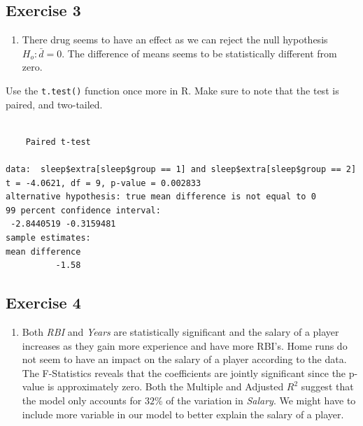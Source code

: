 \documentclass[
  letterpaper,
  DIV=11,
  numbers=noendperiod]{scrreprt}
\newenvironment{Shaded}{\begin{snugshade}}{\end{snugshade}}
\newcommand{\AttributeTok}[1]{\textcolor[rgb]{0.40,0.45,0.13}{#1}}
\newcommand{\DecValTok}[1]{\textcolor[rgb]{0.68,0.00,0.00}{#1}}
\newcommand{\FloatTok}[1]{\textcolor[rgb]{0.68,0.00,0.00}{#1}}
\newcommand{\FunctionTok}[1]{\textcolor[rgb]{0.28,0.35,0.67}{#1}}
\newcommand{\NormalTok}[1]{\textcolor[rgb]{0.00,0.23,0.31}{#1}}
\newcommand{\SpecialCharTok}[1]{\textcolor[rgb]{0.37,0.37,0.37}{#1}}
\newcommand{\StringTok}[1]{\textcolor[rgb]{0.13,0.47,0.30}{#1}}
\providecommand{\tightlist}{%
  \setlength{\itemsep}{0pt}\setlength{\parskip}{0pt}}\usepackage{longtable,booktabs,array}
\begin{document}
\hypertarget{exercise-3-27}{%
\subsection*{Exercise 3}\label{exercise-3-27}}

\begin{enumerate}
\def\labelenumi{\arabic{enumi}.}
\tightlist
\item
  There drug seems to have an effect as we can reject the null
  hypothesis \(H_{o}:\bar {d} = 0\). The difference of means seems to be
  statistically different from zero.
\end{enumerate}

Use the \texttt{t.test()} function once more in R. Make sure to note
that the test is paired, and two-tailed.

\begin{Shaded}
\end{Shaded}

\begin{verbatim}

    Paired t-test

data:  sleep$extra[sleep$group == 1] and sleep$extra[sleep$group == 2]
t = -4.0621, df = 9, p-value = 0.002833
alternative hypothesis: true mean difference is not equal to 0
99 percent confidence interval:
 -2.8440519 -0.3159481
sample estimates:
mean difference 
          -1.58 
\end{verbatim}

\hypertarget{exercise-4-15}{%
\subsection*{Exercise 4}\label{exercise-4-15}}

\begin{enumerate}
\def\labelenumi{\arabic{enumi}.}
\tightlist
\item
  Both \emph{RBI} and \emph{Years} are statistically significant and the
  salary of a player increases as they gain more experience and have
  more RBI's. Home runs do not seem to have an impact on the salary of a
  player according to the data. The F-Statistics reveals that the
  coefficients are jointly significant since the p-value is
  approximately zero. Both the Multiple and Adjusted \(R^2\) suggest
  that the model only accounts for \(32\)\% of the variation in
  \emph{Salary}. We might have to include more variable in our model to
  better explain the salary of a player.
\end{enumerate}
\end{document}
